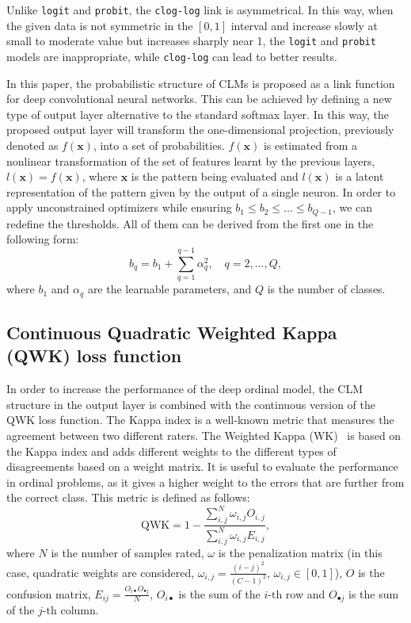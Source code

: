 \documentclass[journal]{IEEEtran}
\begin{document}
	Unlike \texttt{logit} and \texttt{probit}, the \texttt{clog-log} link is asymmetrical. In this way, when the given data is not symmetric in the $[0,1]$ interval and increase slowly at small to moderate value but increases sharply near 1, the \texttt{logit} and \texttt{probit} models are inappropriate, while \texttt{clog-log} can lead to better results.
	
	In this paper, the probabilistic structure of CLMs is proposed as a link function for deep convolutional neural networks. This can be achieved by defining a new type of output layer alternative to the standard softmax layer. In this way, the proposed output layer will transform the one-dimensional projection, previously denoted as $f(\mathbf{x})$, into a set of probabilities. $f(\mathbf{x})$ is estimated from a nonlinear transformation of the set of features learnt by the previous layers, $l(\mathbf{x})=f(\mathbf{x})$, where $\mathbf{x}$ is the pattern being evaluated and $l(\mathbf{x})$ is a latent representation of the pattern given by the output of a single neuron. In order to apply unconstrained optimizers while ensuring $b_1 \le b_2 \le ... \le b_{Q-1}$, we can redefine the thresholds. All of them can be derived from the first one in the following form:
	\begin{equation}
	\nonumber
	b_q = b_1 + \sum_{q=1}^{q-1} \alpha_q^2, \quad q = 2, ..., Q,
	\end{equation}
	where $b_1$ and $\alpha_q$ are the learnable parameters, and $Q$ is the number of classes.
	
	\subsection{Continuous Quadratic Weighted Kappa (QWK) loss function}
	\label{sect:wk}
	
	In order to increase the performance of the deep ordinal model, the CLM structure in the output layer is combined with the continuous version of the QWK loss \cite{de2018weighted} function. The Kappa index is a well-known metric that measures the agreement between two different raters. The Weighted Kappa (WK)~\cite{ben2008comparison} is based on the Kappa index and adds different weights to the different types of disagreements based on a weight matrix. It is useful to evaluate the performance in ordinal problems, as it gives a higher weight to the errors that are further from the correct class. This metric is defined as follows:
	\begin{equation}
	\label{eq:qwk}
	\text{QWK} = 1 - \frac{\sum\limits^N_{i,j} \omega_{i,j} O_{i,j}}{\sum\limits^N_{i,j} \omega_{i,j} E_{i,j}},
	\end{equation}
	where $N$ is the number of samples rated, $\omega$ is the penalization matrix (in this case, quadratic weights are considered, $\omega_{i,j} = \frac{(i-j)^2}{(C-1)^2}$, $\omega_{i,j} \in [0,1]$), $O$ is the confusion matrix, $E_{ij} = \frac{O_{i\bullet} O_{\bullet j}}{N}$, $O_{i\bullet}$ is the sum of the $i\text{-th}$ row and $O_{\bullet j}$ is the sum of the $j\text{-th}$ column.
	
\end{document}
